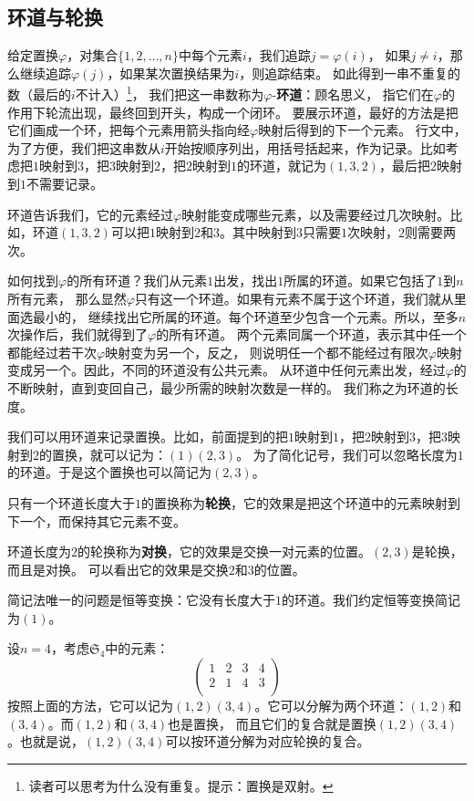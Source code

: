\documentclass[12pt,UTF8]{ctexbook}
\begin{document}
\subsection{环道与轮换}
给定置换$\varphi$，对集合$\{1,2,\ldots, n\}$中每个元素$i$，我们追踪$j = \varphi(i)$，
如果$j\neq i$，那么继续追踪$\varphi(j)$，如果某次置换结果为$i$，则追踪结束。
如此得到一串不重复的数（最后的$i$不计入）\footnote{读者可以思考为什么没有重复。提示：置换是双射。}，
我们把这一串数称为$\varphi$-\textbf{环道}：顾名思义，
指它们在$\varphi$的作用下轮流出现，最终回到开头，构成一个闭环。
要展示环道，最好的方法是把它们画成一个环，把每个元素用箭头指向经$\varphi$映射后得到的下一个元素。
行文中，为了方便，我们把这串数从$i$开始按顺序列出，用括号括起来，作为记录。比如考虑把$1$映射到$3$，把$3$映射到$2$，把$2$映射到$1$的环道，就记为$(1,3,2)$，最后把$2$映射到$1$不需要记录。

环道告诉我们，它的元素经过$\varphi$映射能变成哪些元素，以及需要经过几次映射。比如，环道$(1,3,2)$可以把$1$映射到$2$和$3$。其中映射到$3$只需要$1$次映射，$2$则需要两次。

如何找到$\varphi$的所有环道？我们从元素$1$出发，找出$1$所属的环道。如果它包括了$1$到$n$所有元素，
那么显然$\varphi$只有这一个环道。如果有元素不属于这个环道，我们就从里面选最小的，
继续找出它所属的环道。每个环道至少包含一个元素。所以，至多$n$次操作后，我们就得到了$\varphi$的所有环道。
两个元素同属一个环道，表示其中任一个都能经过若干次$\varphi$映射变为另一个，反之，
则说明任一个都不能经过有限次$\varphi$映射变成另一个。因此，不同的环道没有公共元素。
从环道中任何元素出发，经过$\varphi$的不断映射，直到变回自己，最少所需的映射次数是一样的。
我们称之为环道的长度。

我们可以用环道来记录置换。比如，前面提到的把$1$映射到$1$，把$2$映射到$3$，把$3$映射到$2$的置换，就可以记为：$(1)(2, 3)$。
为了简化记号，我们可以忽略长度为$1$的环道。于是这个置换也可以简记为$(2, 3)$。

只有一个环道长度大于$1$的置换称为\textbf{轮换}，它的效果是把这个环道中的元素映射到下一个，而保持其它元素不变。

环道长度为$2$的轮换称为\textbf{对换}，它的效果是交换一对元素的位置。$(2, 3)$是轮换，而且是对换。
可以看出它的效果是交换$2$和$3$的位置。

简记法唯一的问题是恒等变换：它没有长度大于$1$的环道。我们约定恒等变换简记为$(1)$。

设$n=4$，考虑$\mathfrak{S}_4$中的元素：
$$ \begin{pmatrix}
    1 & 2 & 3 & 4 \\ 2 & 1 & 4 & 3\\
\end{pmatrix} $$
按照上面的方法，它可以记为$(1, 2)(3, 4)$。它可以分解为两个环道：$(1, 2)$和$(3, 4)$。而$(1, 2)$和$(3, 4)$也是置换，
而且它们的复合就是置换$(1, 2)(3, 4)$。也就是说，$(1, 2)(3, 4)$可以按环道分解为对应轮换的复合。
\end{document}
